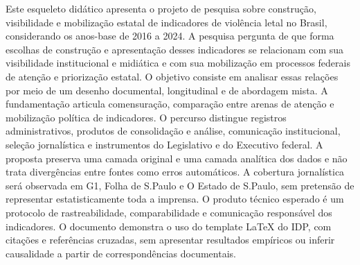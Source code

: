 \begin{resumo}
Este esqueleto didático apresenta o projeto de pesquisa sobre construção, visibilidade e mobilização estatal de indicadores de violência letal no Brasil, considerando os anos-base de 2016 a 2024. A pesquisa pergunta de que forma escolhas de construção e apresentação desses indicadores se relacionam com sua visibilidade institucional e midiática e com sua mobilização em processos federais de atenção e priorização estatal. O objetivo consiste em analisar essas relações por meio de um desenho documental, longitudinal e de abordagem mista. A fundamentação articula comensuração, comparação entre arenas de atenção e mobilização política de indicadores. O percurso distingue registros administrativos, produtos de consolidação e análise, comunicação institucional, seleção jornalística e instrumentos do Legislativo e do Executivo federal. A proposta preserva uma camada original e uma camada analítica dos dados e não trata divergências entre fontes como erros automáticos. A cobertura jornalística será observada em G1, Folha de S.Paulo e O Estado de S.Paulo, sem pretensão de representar estatisticamente toda a imprensa. O produto técnico esperado é um protocolo de rastreabilidade, comparabilidade e comunicação responsável dos indicadores. O documento demonstra o uso do template LaTeX do IDP, com citações e referências cruzadas, sem apresentar resultados empíricos ou inferir causalidade a partir de correspondências documentais.
\end{resumo}
